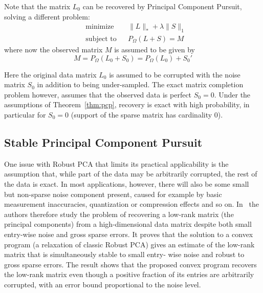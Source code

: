 Note that the matrix $L_0$ can be recovered by Principal Component Pursuit, solving a different problem:
\begin{equation}
\begin{aligned}
&\text{minimize} && \|L\|_* + \lambda \|S\|_1\\
&\text{subject to} && P_\Omega (L+S) = M
\end{aligned}
\end{equation}
where now the observed matrix $M$ is assumed to be given by
\[
M = P_\Omega (L_0 + S_0) = P_\Omega (L_0) + S_0'
\]

Here the original data matrix $L_0$ is assumed to be corrupted with the noise matrix $S_0$ in addition to being under-sampled. The exact matrix completion problem however, assumes that the observed data is perfect $S_0 = 0$. Under the assumptions of Theorem~\ref{thm:pcp}, recovery is exact with high probability, in particular for $S_0 = 0$ (support of the sparse matrix has cardinality $0$).




\subsection{Stable Principal Component Pursuit}

One issue with Robust PCA that limits its practical applicability is the assumption that, while part of the data may be arbitrarily corrupted, the rest of the data is exact. In most applications, however, there will also be some small but non-sparse noise component present, caused for example by basic measurement inaccuracies, quantization or compression effects and so on. In~\cite{Zhou:2010vn} the authors therefore study the problem of recovering a low-rank matrix (the principal components) from a high-dimensional data matrix despite both small entry-wise noise and gross sparse errors. It proves that the solution to a convex program (a relaxation of classic Robust PCA) gives an estimate of the low-rank matrix that is simultaneously stable to small entry- wise noise and robust to gross sparse errors. The result shows that the proposed convex program recovers the low-rank matrix even though a positive fraction of its entries are arbitrarily corrupted, with an error bound proportional to the noise level.

